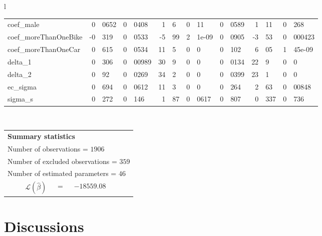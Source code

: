 \documentclass[12pt,a4paper]{article}
\begin{document}
\begin{sidewaystable}[htb]
\begin{tabular}{l}
\begin{tabular}{lr@{.}lr@{.}lr@{.}lr@{.}lr@{.}lr@{.}lr@{.}l}
coef\_male                  &  0&0652 &   0&0408 &     1&6 &     0&11 &        0&0589 &         1&11 &         0&268 \\
coef\_moreThanOneBike       &  -0&319 &   0&0533 &   -5&99 &  2&1e-09 &        0&0905 &        -3&53 &      0&000423 \\
coef\_moreThanOneCar        &   0&615 &   0&0534 &    11&5 &      0&0 &         0&102 &         6&05 &      1&45e-09 \\
delta\_1                    &   0&306 &  0&00989 &    30&9 &      0&0 &        0&0134 &         22&9 &           0&0 \\
delta\_2                    &    0&92 &   0&0269 &    34&2 &      0&0 &        0&0399 &         23&1 &           0&0 \\
ec\_sigma                   &   0&694 &   0&0612 &    11&3 &      0&0 &         0&264 &         2&63 &       0&00848 \\
sigma\_s                    &   0&272 &    0&146 &    1&87 &   0&0617 &         0&807 &        0&337 &         0&736 \\
\hline
\end{tabular}
\\
\begin{tabular}{rcl}
\multicolumn{3}{l}{\bf Summary statistics}\\
\multicolumn{3}{l}{ Number of observations = $1906$} \\
\multicolumn{3}{l}{ Number of excluded observations = $359$} \\
\multicolumn{3}{l}{ Number of estimated  parameters = $46$} \\
 $\mathcal{L}(\hat{\beta})$ &=& $-18559.08 $  \\
\end{tabular}
  \end{tabular}

 \end{sidewaystable}

\clearpage



\section{Discussions}
\end{document}
